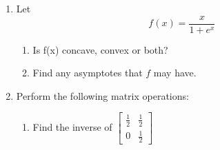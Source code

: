 \documentclass[11pt]{article}
\begin{document}
\begin{enumerate}




\bigskip
\bigskip
\bigskip
\bigskip
\bigskip
\bigskip
\bigskip
\bigskip
\bigskip
\bigskip

\vspace{.2in}
\item Let $$f(x)=\frac{x}{1+e^x}$$
\begin{enumerate}
\item Is f(x) concave, convex or both?




\bigskip
\bigskip
\bigskip
\bigskip
\bigskip
\bigskip
\bigskip
\bigskip
\bigskip
\bigskip

\item Find any asymptotes that $f$ may have.
\bigskip
\bigskip
\bigskip
\bigskip
\bigskip
\bigskip
\bigskip
\bigskip
\bigskip
\bigskip
\end{enumerate}

\item Perform the following matrix operations:

\begin{enumerate}
\item Find the inverse of $\begin{bmatrix}\frac{1}{2} & \frac{1}{2}\\ 0& \frac{1}{2}
\end{bmatrix}$


\end{enumerate}
\end{enumerate}
\end{document}
